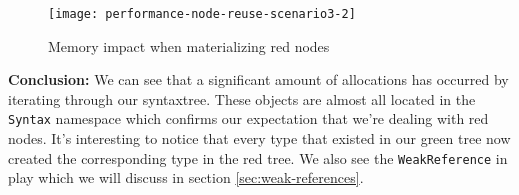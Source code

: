 \begin{itemize}
\begin{minipage}{\linewidth}
\begin{figure}[H]
\centering
\texttt{[image: performance-node-reuse-scenario3-2]}
\caption{Memory impact when materializing red nodes}
\label{img:performance-node-reuse-scenario3-2}
\end{figure}
\end{minipage}


\textbf{Conclusion:} We can see that a significant amount of allocations has occurred by iterating through our \gls{syntaxtree}. These objects are almost all located in the \texttt{Syntax} namespace which confirms our expectation that we're dealing with red nodes. It's interesting to notice that every type that existed in our green tree now created the corresponding type in the red tree. We also see the \texttt{WeakReference} in play which we will discuss in section \ref{sec:weak-references}.

\end{itemize}